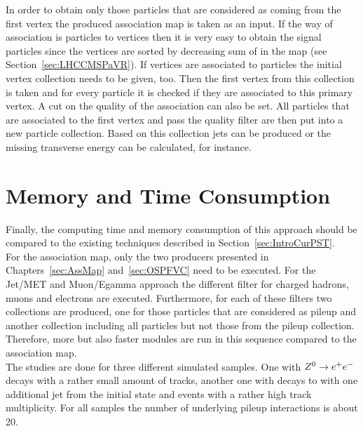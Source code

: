 In order to obtain only those particles that are considered as coming from the first vertex the produced association map is taken as an input. If the way of association is particles to vertices then it is very easy to obtain the signal particles since the vertices are sorted by decreasing sum of \pt in the map (see Section~\ref{sec:LHCCMSPaVR}). If vertices are associated to particles the initial vertex collection needs to be given, too. Then the first vertex from this collection is taken and for every particle it is checked if they are associated to this primary vertex. A cut on the quality of the association can also be set. All particles that are associated to the first vertex and pass the quality filter are then put into a new particle collection. Based on this collection jets can be produced or the missing transverse energy can be calculated, for instance.

\section{Memory and Time Consumption \label{sec:OSPMemTime}}
Finally, the computing time and memory consumption of this approach should be compared to the existing techniques described in Section~\ref{sec:IntroCurPST}. \\
For the association map, only the two producers presented in Chapters~\ref{sec:AssMap} and~\ref{sec:OSPFVC} need to be executed. For the Jet/MET and Muon/Egamma approach the different filter for charged hadrons, muons and electrons are executed. Furthermore, for each of these filters two collections are produced, one for those particles that are considered as pileup and another collection including all particles but not those from the pileup collection. Therefore, more but also faster modules are run in this sequence compared to the association map. \\
The studies are done for three different simulated samples. One with ${Z^{0}}\rightarrow e^+e^-$ decays with a rather small amount of tracks, another one with \Zz decays to \MM with one additional jet from the initial state and \ttbar events with a rather high track multiplicity. For all samples the number of underlying pileup interactions is about 20. \\



\clearpage{}

